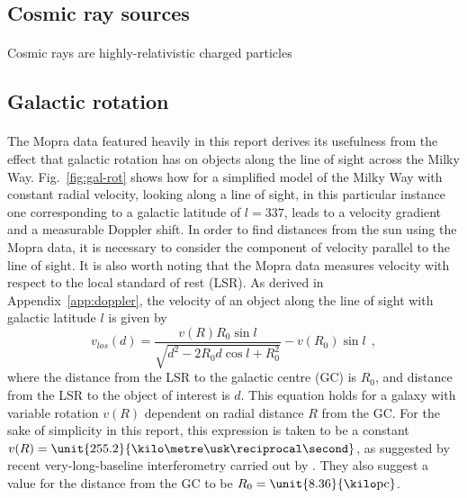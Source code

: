 \documentclass[a4paper, titlepage, oneside]{article}
\newcommand{\parsec}{\mathrm{pc}}
\begin{document}
\begin{multicols}{2}
\subsection{Cosmic ray sources}
\paragraph{}
Cosmic rays are highly-relativistic charged particles 

\subsection{Galactic rotation}
\label{sec:gal-rot}
\paragraph{}
The Mopra data featured heavily in this report \parencite{Burton:2013} derives its usefulness from the effect that galactic rotation has on objects along the line of sight across the Milky Way. Fig.~\ref{fig:gal-rot} shows how for a simplified model of the Milky Way with constant radial velocity, looking along a line of sight, in this particular instance one corresponding to a galactic latitude of \(l=337\), leads to a velocity gradient and a measurable Doppler shift. In order to find distances from the sun using the Mopra data, it is necessary to consider the component of velocity parallel to the line of sight. It is also worth noting that the Mopra data measures velocity with respect to the local standard of rest (LSR). As derived in Appendix~\ref{app:doppler}, the velocity of an object along the line of sight with galactic latitude \(l\) is given by
\begin{equation}
  v_{los}(d)=\frac{v(R)R_0\sin{l}}{\sqrt{d^2-2R_0d\cos{l}+R_0^2}}-v(R_0)\sin{l}\;\,,
\end{equation}
where the distance from the LSR to the galactic centre (GC) is \(R_0\), and distance from the LSR to the object of interest is \(d\). This equation holds for a galaxy with variable rotation \(v(R)\) dependent on radial distance \(R\) from the GC. For the sake of simplicity in this report, this expression is taken to be a constant \(v(R)=\unit{255.2}{\kilo\metre\usk\reciprocal\second}\), as suggested by recent very-long-baseline interferometry carried out by \textcite{Reid:2014}. They also suggest a value for the distance from the GC to be \(R_0=\unit{8.36}{\kilo\parsec}\).


\end{multicols}
\end{document}
